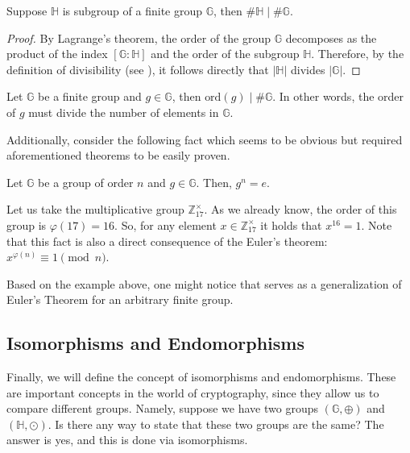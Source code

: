 \documentclass[../../book.tex]{subfiles}
\begin{document}
\begin{corollary}
    Suppose $\mathbb{H}$ is subgroup of a finite group $\mathbb{G}$, 
    then $\#\mathbb{H} \mid \#\mathbb{G}$.
\end{corollary}

\begin{proof}
By Lagrange's theorem, the order of the group $\mathbb{G}$ 
decomposes as the product of the index $\left[ \mathbb{G} : \mathbb{H} \right]$ and the order of the 
subgroup $\mathbb{H}$. Therefore, by the definition of divisibility (see ), 
it follows directly that $\left| \mathbb{H} \right|$ divides $\left| \mathbb{G} \right|$.
\end{proof}

\begin{corollary}
    Let $\mathbb{G}$ be a finite group and $g \in \mathbb{G}$, 
    then $\text{ord}(g) \mid \#\mathbb{G}$. In other words, the order of $g$ must 
    divide the number of elements in $\mathbb{G}$. 
\end{corollary}

Additionally, consider the following fact which seems to be obvious but required aforementioned 
theorems to be easily proven.

\begin{corollary}\label{corollary:group-exp}
    Let $\mathbb{G}$ be a group of order $n$ and $g \in \mathbb{G}$. Then,
    $g^{n} = e$.
\end{corollary}

\begin{example}
    Let us take the multiplicative group $\mathbb{Z}_{17}^{\times}$. As we
    already know, the order of this group is $\varphi(17) = 16$. So, for any
    element $x \in \mathbb{Z}_{17}^{\times}$ it holds that $x^{16} = 1$. Note
    that this fact is also a direct consequence of the Euler's theorem:
    $x^{\varphi(n)} \equiv 1 \pmod{n}$.
\end{example}

Based on the example above, one might notice that 
serves as a generalization of Euler's Theorem for an arbitrary finite group.

\subsection{Isomorphisms and Endomorphisms}

Finally, we will define the concept of isomorphisms and endomorphisms. These are important concepts in the world of cryptography, since they allow us to compare different groups. Namely, 
suppose we have two groups $(\mathbb{G},\oplus)$ and $(\mathbb{H}, \odot)$. Is there any way to state that these two groups are the same? The answer is yes, and this is done via isomorphisms.
\end{document}

